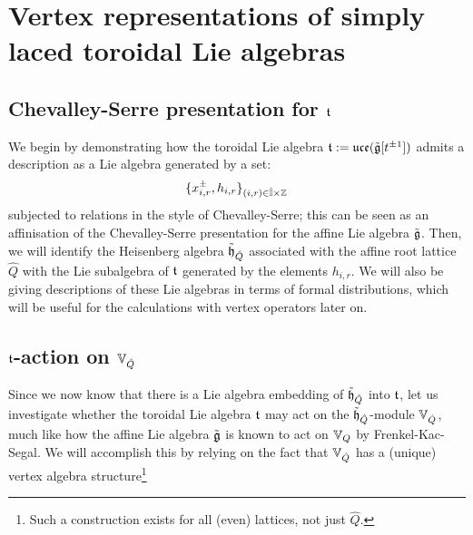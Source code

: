 \section{Vertex representations of simply laced toroidal Lie algebras}
    \subsection{Chevalley-Serre presentation for \texorpdfstring{$\mathfrak{t}$}{}}
        We begin by demonstrating how the toroidal Lie algebra $\mathfrak{t} := \mathfrak{uce}(\tilde{\mathfrak{g}}[t^{\pm 1}])$ admits a description as a Lie algebra generated by a set:
            $$\{x_{i, r}^{\pm}, h_{i, r}\}_{(i, r) \in \hat{\simpleroots} \x \Z}$$
        subjected to relations in the style of Chevalley-Serre; this can be seen as an affinisation of the Chevalley-Serre presentation for the affine Lie algebra $\tilde{\mathfrak{g}}$. Then, we will identify the Heisenberg algebra $\tilde{\mathfrak{h}}_{\hat{Q}}$ associated with the affine root lattice $\hat{Q}$ with the Lie subalgebra of $\mathfrak{t}$ generated by the elements $h_{i, r}$. We will also be giving descriptions of these Lie algebras in terms of formal distributions, which will be useful for the calculations with vertex operators later on. 

    \subsection{\texorpdfstring{$\mathfrak{t}$}{}-action on \texorpdfstring{$\mathbb{V}_{\hat{Q}}$}{}}
        Since we now know that there is a Lie algebra embedding of $\tilde{\mathfrak{h}}_{\hat{Q}}$ into $\mathfrak{t}$, let us investigate whether the toroidal Lie algebra $\mathfrak{t}$ may act on the $\tilde{\mathfrak{h}}_{\hat{Q}}$-module $\mathbb{V}_{\hat{Q}}$, much like how the affine Lie algebra $\tilde{\mathfrak{g}}$ is known to act on $\mathbb{V}_Q$ by Frenkel-Kac-Segal. We will accomplish this by relying on the fact that $\mathbb{V}_{\hat{Q}}$ has a (unique) vertex algebra structure\footnote{Such a construction exists for all (even) lattices, not just $\hat{Q}$.} 